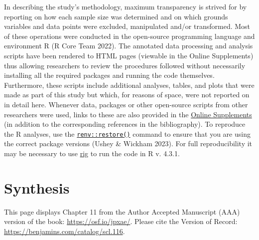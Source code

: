 \documentclass[
  letterpaper,
  DIV=11,
  numbers=noendperiod]{scrreprt}
\begin{document}
In describing the study's methodology, maximum transparency is strived
for by reporting on how each sample size was determined and on which
grounds variables and data points were excluded, manipulated and/or
transformed. Most of these operations were conducted in the open-source
programming language and environment R (R Core Team 2022). The annotated
data processing and analysis scripts have been rendered to HTML pages
(viewable in the Online Supplements) thus allowing researchers to review
the procedures followed without necessarily installing all the required
packages and running the code themselves. Furthermore, these scripts
include additional analyses, tables, and plots that were made as part of
this study but which, for reasons of space, were not reported on in
detail here. Whenever data, packages or other open-source scripts from
other researchers were used, links to these are also provided in the
\href{https://elenlefoll.github.io/TextbookMDA/references.html}{Online
Supplements} (in addition to the corresponding references in the
bibliography). To reproduce the R analyses, use the
\href{https://rstudio.github.io/renv/reference/restore.html}{\texttt{renv::restore()}}
command to ensure that you are using the correct package versions (Ushey
\& Wickham 2023). For full reproducibility it may be necessary to use
\href{https://github.com/r-lib/rig}{rig} to run the code in R v. 4.3.1.


\chapter{Synthesis}\label{synthesis}

\begin{tcolorbox}[enhanced jigsaw, bottomtitle=1mm, colframe=quarto-callout-note-color-frame, title=\textcolor{quarto-callout-note-color}{\faInfo}\hspace{0.5em}{Note}, colback=white, coltitle=black, colbacktitle=quarto-callout-note-color!10!white, titlerule=0mm, toprule=.15mm, bottomrule=.15mm, breakable, arc=.35mm, left=2mm, rightrule=.15mm, toptitle=1mm, opacityback=0, leftrule=.75mm, opacitybacktitle=0.6]

This page displays Chapter 11 from the Author Accepted Manuscript (AAA)
version of the book: \url{https://osf.io/jpxae/}. Please cite the
Version of Record: \url{https://benjamins.com/catalog/scl.116}.

\end{tcolorbox}
\end{document}
